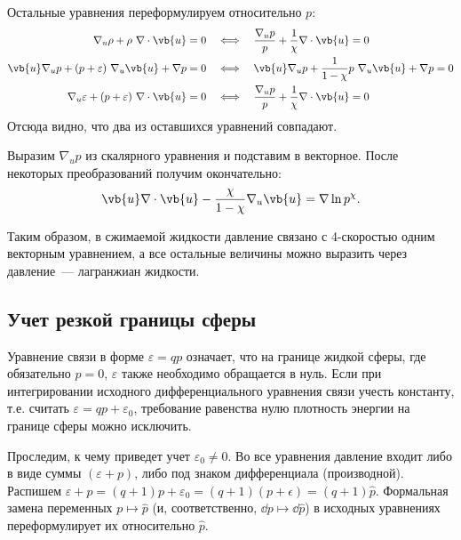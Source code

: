 \documentclass[\docroot/reports/draft/report.tex]{subfiles}
\begin{document}
    Остальные уравнения переформулируем относительно $p$:
    \begin{align*}
        \nabla_u \rho + \rho\ \nabla \cdot \vb{u} = 0 \quad&\Longleftrightarrow\quad
        \frac{\nabla_u p}{p} + \frac{1}{\chi} \nabla \cdot \vb{u} = 0 \\
        \vb{u} \nabla_u p + (p + \varepsilon)\ \nabla_u \vb{u} + \nabla p = 0 \quad&\Longleftrightarrow\quad
        \vb{u} \nabla_u p + \frac{1}{1-\chi} p\ \nabla_u \vb{u} + \nabla p = 0 \\
        \nabla_u \varepsilon + (p + \varepsilon)\ \nabla \cdot \vb{u} = 0 \quad&\Longleftrightarrow\quad
        \frac{\nabla_u p}{p} + \frac{1}{\chi} \nabla \cdot \vb{u} = 0
    \end{align*}
    Отсюда видно, что два из оставшихся уравнений совпадают.

    Выразим $\nabla_u p$ из скалярного уравнения и подставим в векторное. После некоторых преобразований получим окончательно:
    \begin{equation}
        \vb{u} \nabla \cdot \vb{u} - \frac{\chi}{1 - \chi} \nabla_u \vb{u} = \nabla \ln p^{\chi} .
    \end{equation}

    Таким образом, в сжимаемой жидкости давление связано с 4-скоростью одним векторным уравнением, а все остальные величины можно выразить через давление~--- лагранжиан жидкости.

\subsection{Учет резкой границы сферы}

    Уравнение связи в форме $\varepsilon = q p$ означает, что на границе жидкой сферы, где обязательно $p = 0$, $\varepsilon$ также необходимо обращается в нуль. Если при интегрировании исходного дифференциального уравнения связи учесть константу, т.е. считать $\varepsilon = q p + \varepsilon_0$, требование равенства нулю плотность энергии на границе сферы можно исключить.

    Проследим, к чему приведет учет $\varepsilon_0 \neq 0$. Во все уравнения давление входит либо в виде суммы $(\varepsilon + p)$, либо под знаком дифференциала (производной). Распишем $\varepsilon + p = (q + 1) p + \varepsilon_0 = (q + 1) (p + \epsilon) = (q + 1) \hat{p}$. Формальная замена переменных $p \mapsto \hat{p}$ (и, соответственно, $\dd{p} \mapsto \dd{\hat{p}}$) в исходных уравнениях переформулирует их относительно $\hat{p}$.

\end{document}
